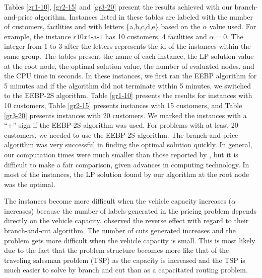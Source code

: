 Tables \ref{gr1-10}, \ref{gr2-15} and \ref{gr3-20} present the results
achieved with our branch-and-price algorithm. Instances listed in
these tables are labeled with the number of customers, facilities and
with letters \{a,b,c,d,e\} based on the $\alpha$ value used. For
example, the instance $r10x\textrm{4-a-1}$ has 10 customers, 4 facilities and
$\alpha = 0$. The integer from 1 to 3 after the letters represents the id
of the instances within the same group. The tables present the name of each
instance, the LP solution value at the root node, the optimal solution
value, the number of evaluated nodes, and the CPU time in seconds. In
these instances, we first ran the EEBP algorithm for 5 minutes and if
the algorithm did not terminate within 5 minutes, we switched to the
EEBP-2S algorithm. Table \ref{gr1-10} presents the results for
instances with 10 customers, Table \ref{gr2-15} presents instances
with 15 customers, and Table \ref{gr3-20} presents instances with 20
customers. We marked the instances with a ``+'' sign if the EEBP-2S
algorithm was used. For problems with at least 20 customers, we needed
to use the EEBP-2S algorithm. The branch-and-price algorithm was very
successful in finding the optimal solution quickly. 
In general, our computation times were much smaller than those
reported by \citet{Laporte86}, but it is difficult to make a fair
comparison, given advances in computing technology. In most of the
instances, the LP solution found by our algorithm at the root node was
the optimal.

The instances become more difficult when the vehicle capacity
increases ($\alpha$ increases) because the number of labels
generated in the pricing problem depends directly on the vehicle
capacity. \citet{Laporte86} observed the reverse effect with regard to
their branch-and-cut algorithm. The number of cuts generated increases
and the problem gets more difficult when the vehicle capacity is
small. This is most likely due to the fact that the problem structure
becomes more like that of the traveling salesman problem (TSP) as the
capacity is increased and the TSP is much easier to solve by branch
and cut than as a capacitated routing problem.

